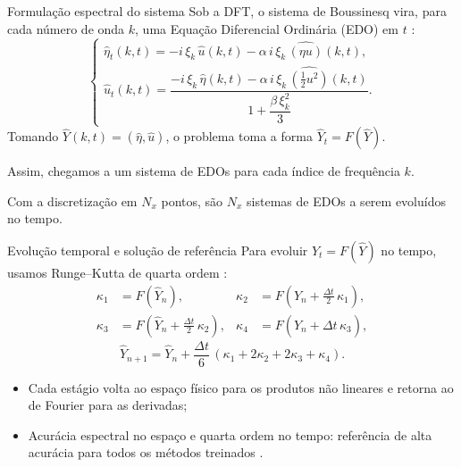 \begin{frame}{Formulação espectral do sistema}
  Sob a DFT, o sistema de Boussinesq vira, para cada número de onda $k$, uma Equação Diferencial Ordinária (EDO) em $t$ \parencite{martins2023}:
  \begin{equation*}
    \begin{cases}
      \hat{\eta}_t(k,t) = -i\,\xi_k\,\hat{u}(k,t) - \alpha\,i\,\xi_k\,\widehat{(\eta u)}(k,t), \\[10pt]
      \hat{u}_t(k,t) = \dfrac{-i\,\xi_k\,\hat{\eta}(k,t) - \alpha\,i\,\xi_k\,\widehat{\left(\tfrac{1}{2}u^2\right)}(k,t)}
                            {1 + \dfrac{\beta\,\xi_k^2}{3}} .
    \end{cases}
  \end{equation*}
  Tomando $\hat{Y}(k,t) = (\hat\eta, \hat u)$, o problema toma a forma
  $\hat{Y}_t = F(\hat{Y})$.
  \vspace{6pt}

  Assim, chegamos a um sistema de EDOs para cada índice de frequência $k$.
  
  Com a discretização em $N_x$ pontos, são $N_x$ sistemas de EDOs a serem evoluídos no
  tempo.
\end{frame}

\begin{frame}{Evolução temporal e solução de referência}
  Para evoluir $\hat{Y}_t = F(\hat{Y})$ no tempo, usamos Runge--Kutta de quarta ordem
  \parencite{suli2003, burden2011}:
  \begin{align*}
    \kappa_1 &= F(\hat{Y}_n), & \kappa_2 &= F\!\left(\hat{Y}_n + \tfrac{\Delta t}{2}\,\kappa_1\right), \\
    \kappa_3 &= F\!\left(\hat{Y}_n + \tfrac{\Delta t}{2}\,\kappa_2\right), & \kappa_4 &= F\!\left(\hat{Y}_n + \Delta t\,\kappa_3\right),
  \end{align*}
  \begin{equation*}
    \hat{Y}_{n+1} = \hat{Y}_n + \frac{\Delta t}{6}\,(\kappa_1 + 2\kappa_2 + 2\kappa_3 + \kappa_4).
  \end{equation*}
  \begin{itemize}[<+->]
    \item Cada estágio volta ao espaço físico para os produtos não lineares e
          retorna ao de Fourier para as derivadas;
    \item Acurácia espectral no espaço e quarta ordem no tempo: referência de alta
          acurácia para todos os métodos treinados
          \parencite{trefethen2000, steinmoeller2012}.
  \end{itemize}
\end{frame}
